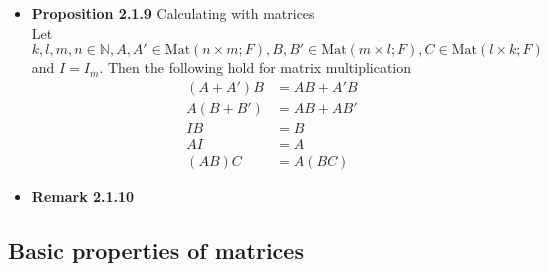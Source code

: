 \documentclass[11pt,a4paper]{article}
\begin{document}
\begin{itemize}
    \item \textbf{Proposition 2.1.9} Calculating with matrices \\
        Let $k, l, m, n \in \mathbb{N}, A, A' \in \mathrm{Mat}(n \times m;F),
        B, B' \in \mathrm{Mat}(m \times l;F), C \in \mathrm{Mat}(l \times k; F)$ and
        $I = I_m$.
        Then the following hold for matrix multiplication
        \begin{align*}{}
            (A + A')B & = AB + A'B \\
            A(B + B') & = AB + AB' \\
            IB        & = B \\
            AI        & = A \\
            (AB)C     & = A(BC)
        \end{align*}

    \item \textbf{Remark 2.1.10}

\end{itemize}

\subsection{Basic properties of matrices}
\end{document}
